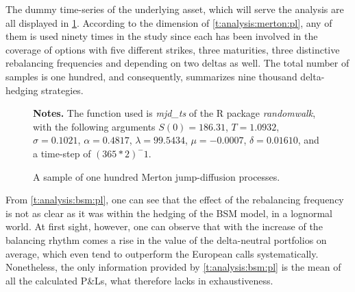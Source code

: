 \documentclass[12pt,a4paper]{report}
\begin{document}
The dummy time-series of the underlying asset, which will serve the analysis are all displayed in \cref{p:analysis:mjd:100}. 
According to the dimension of \cref{t:analysis:merton:pl}, any of them is used ninety times in the study since each has been involved in the coverage of options with five different strikes, three maturities, three distinctive rebalancing frequencies and depending on two deltas as well.
The total number of samples is one hundred, and consequently,  summarizes nine thousand delta-hedging strategies.

\begin{figure}[h]
  \centering
  
  \caption{A sample of one hundred Merton jump-diffusion processes.}
  \begin{changemargin}{0.5cm}{0.5cm}
  \medskip
\footnotesize
{}\textbf{Notes.} The function used is \textit{mjd\_ts} of the R package \textit{randomwalk}, with the following arguments $S(0) = 186.31$, $T = 1.0932$, $\sigma = 0.1021$, $\alpha = 0.4817$, $\lambda = 99.5434$, $\mu = -0.0007$, $\delta = 0.01610$, and a time-step of $(365 * 2)^-1$.
  \end{changemargin}
  \label{p:analysis:mjd:100}
\end{figure}













From \cref{t:analysis:bsm:pl}, one can see that the effect of the rebalancing frequency is not as clear as it was within the hedging of the BSM model, in a lognormal world.
At first sight, however, one can observe that with the increase of the balancing rhythm comes a rise in the value of the delta-neutral portfolios on average, which even tend to outperform the European calls systematically.
Nonetheless, the only information provided by \cref{t:analysis:bsm:pl} is the mean of all the calculated P\&Ls, what therefore lacks in exhaustiveness.
\end{document}
